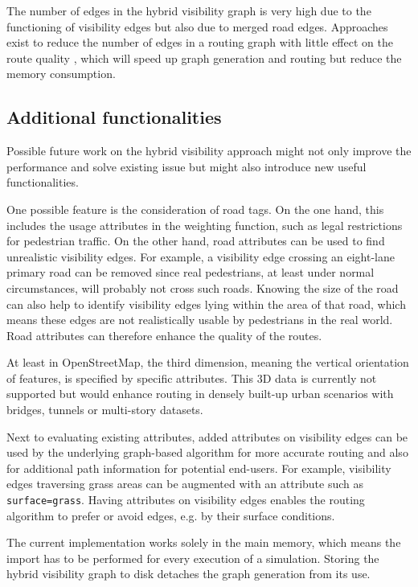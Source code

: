		The number of edges in the hybrid visibility graph is very high due to the functioning of visibility edges but also due to merged road edges.
		Approaches exist to reduce the number of edges in a routing graph with little effect on the route quality \cite{aumann-reducing-routing-graph}, which will speed up graph generation and routing but reduce the memory consumption.

	\subsection{Additional functionalities}
		
		Possible future work on the hybrid visibility approach might not only improve the performance and solve existing issue but might also introduce new useful functionalities.
		
		One possible feature is the consideration of road tags.
		On the one hand, this includes the usage attributes in the weighting function, such as legal restrictions for pedestrian traffic.
		On the other hand, road attributes can be used to find unrealistic visibility edges.
		For example, a visibility edge crossing an eight-lane primary road can be removed since real pedestrians, at least under normal circumstances, will probably not cross such roads.
		Knowing the size of the road can also help to identify visibility edges lying within the area of that road, which means these edges are not realistically usable by pedestrians in the real world.
		Road attributes can therefore enhance the quality of the routes.
		
		At least in OpenStreetMap, the third dimension, meaning the vertical orientation of features, is specified by specific attributes.
		This 3D data is currently not supported but would enhance routing in densely built-up urban scenarios with bridges, tunnels or multi-story datasets.
		
		Next to evaluating existing attributes, added attributes on visibility edges can be used by the underlying graph-based algorithm for more accurate routing and also for additional path information for potential end-users.
		For example, visibility edges traversing grass areas can be augmented with an attribute such as \texttt{surface=grass}.
		Having attributes on visibility edges enables the routing algorithm to prefer or avoid edges, e.g. by their surface conditions.
		
		The current implementation works solely in the main memory, which means the import has to be performed for every execution of a simulation.
		Storing the hybrid visibility graph to disk detaches the graph generation from its use.
		
